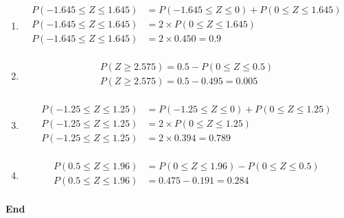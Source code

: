 \documentclass[a4paper, leqno, 12pt]{article} %
\newenvironment{top_enumerate}{
\begin{enumerate}
  \setlength{\itemsep}{2em}
  \setlength{\topsep}{-0pt}
  \setlength{\partopsep}{-0pt}
}{\end{enumerate}}
\begin{document}
\begin{top_enumerate}
\setcounter{equation}{0}  %
\begin{enumerate}
	\setlength{\topsep}{-0pt}
	\setlength{\partopsep}{-0pt}
	\setlength{\itemsep}{10pt}
			\item \[
	\begin{aligned}
	P({-1.645} \le Z \le {1.645}) & = P({-1.645} \le Z \le 0 ) + P( 0 \le Z \le {1.645})\\
	P({-1.645} \le Z \le {1.645}) & = 2 \times P( 0 \le Z \le {1.645})\\
	P({-1.645} \le Z \le {1.645}) & = 2 \times {0.450} = {0.9}\\
	\end{aligned}
	\]
	 \quad \textbf{}
		\item \[
	\begin{aligned}
	P(Z \ge {2.575}) = 0.5 - P( 0 \le Z \le {0.5})\\
	P(Z \ge {2.575}) = 0.5 - {0.495} = {0.005} \\
	\end{aligned}
	\]
	 \quad \textbf{}
		\item \[
	\begin{aligned}
	P({-1.25} \le Z \le {1.25}) & = P({-1.25} \le Z \le 0 ) + P( 0 \le Z \le {1.25})\\
	P({-1.25} \le Z \le {1.25}) & = 2 \times P( 0 \le Z \le {1.25})\\
	P({-1.25} \le Z \le {1.25}) & = 2 \times {0.394} = {0.789}\\
	\end{aligned}
	\]
	 \quad \textbf{}
		\item \[
	\begin{aligned}
	P({0.5} \le Z \le {1.96}) & = P( 0 \le Z \le {1.96}) - P( 0 \le Z \le {0.5})\\
	P({0.5} \le Z \le {1.96}) & = {0.475} - {0.191} = {0.284}\\
	\end{aligned}
	\]
	 \quad \textbf{}
\end{enumerate}\newpage


\end{top_enumerate}

\rfoot{}                %
\begin{flushright}      %
\textbf{End}
\end{flushright}
\end{document}

